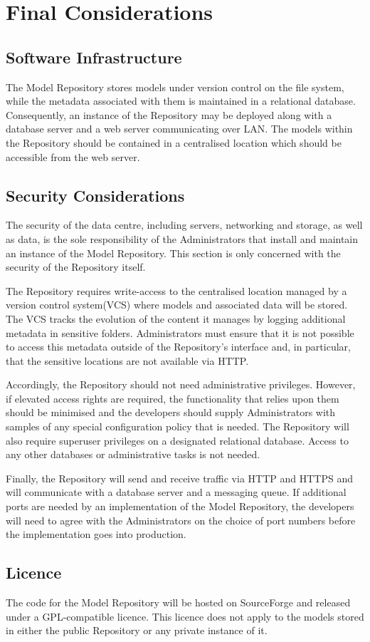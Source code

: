 \section{Final Considerations} 

\subsection{Software Infrastructure}
\label{softwareInfrastructure}
The \ddmore Model Repository stores models under version control on the file system, while the metadata associated with them is maintained in a relational database. Consequently, an instance of the Repository may be deployed along with a database server and a web server communicating over LAN. The models within the Repository should be contained in a centralised location which should be accessible from the web server.

\subsection{Security Considerations}
\label{securityConsiderations}
The security of the data centre, including servers, networking and storage, as well as data, is the sole responsibility of the Administrators that install and maintain an instance of the \ddmore Model Repository. This section is only concerned with the security of the Repository itself. 

The Repository requires write-access to the centralised location managed by a version control system(VCS) where models and associated data will be stored. The VCS tracks the evolution of the content it manages by logging additional metadata in sensitive folders. Administrators must ensure that it is not possible to access this metadata outside of the Repository's interface and, in particular, that the sensitive locations are not available via HTTP. 

Accordingly, the Repository should not need administrative privileges. However, if elevated access rights are required, the functionality that relies upon them should be minimised and the developers should supply Administrators with samples of any special configuration policy that is needed. The Repository will also require superuser privileges on a designated relational database. Access to any other databases or administrative tasks is not needed.

Finally, the Repository will send and receive traffic via HTTP and HTTPS and will communicate with a database server and a messaging queue. If additional ports are needed by an implementation of the \ddmore Model Repository, the developers will need to agree with the Administrators on the choice of port numbers before the implementation goes into production. 

\subsection{Licence}
\label{licence}
The code for the \ddmore Model Repository will be hosted on SourceForge and released under a GPL-compatible licence. This licence does not apply to the models stored in either the public Repository or any private instance of it. 
